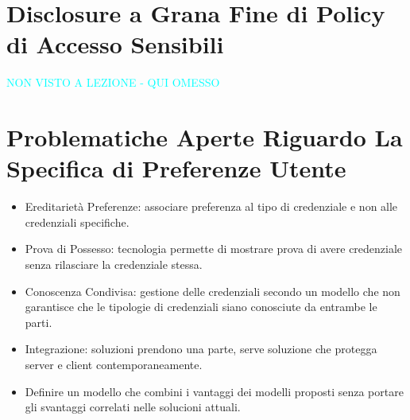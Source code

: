 \section{Disclosure a Grana Fine di Policy di Accesso Sensibili}

\textcolor{cyan}{NON VISTO A LEZIONE - QUI OMESSO}



\section{Problematiche Aperte Riguardo La Specifica di Preferenze Utente}
\begin{itemize}
    \item Ereditarietà Preferenze: associare preferenza al tipo di credenziale e non alle credenziali specifiche.
    \item Prova di Possesso: tecnologia permette di mostrare prova di avere credenziale senza rilasciare la credenziale stessa.
    \item Conoscenza Condivisa: gestione delle credenziali secondo un modello che non garantisce che le tipologie di credenziali siano conosciute da entrambe le parti.
    \item Integrazione: soluzioni prendono una parte, serve soluzione che protegga server e client contemporaneamente.
    \item Definire un modello che combini i vantaggi dei modelli proposti senza portare gli svantaggi correlati nelle solucioni attuali.
\end{itemize}